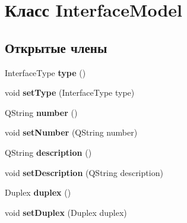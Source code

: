 \hypertarget{class_interface_model}{}\section{Класс Interface\+Model}
\label{class_interface_model}
\subsection*{Открытые члены}
\begin{DoxyCompactItemize}
\item 
Interface\+Type {\bfseries type} ()\hypertarget{class_interface_model_ab9a3cf858cda42f7f21d86c701ed9baa}{}\label{class_interface_model_ab9a3cf858cda42f7f21d86c701ed9baa}

\item 
void {\bfseries set\+Type} (Interface\+Type type)\hypertarget{class_interface_model_a6d1e3a33e22e61dfbc860a23016b936e}{}\label{class_interface_model_a6d1e3a33e22e61dfbc860a23016b936e}

\item 
Q\+String {\bfseries number} ()\hypertarget{class_interface_model_ab7d36b21ece7aaeff0ad1399eaee6877}{}\label{class_interface_model_ab7d36b21ece7aaeff0ad1399eaee6877}

\item 
void {\bfseries set\+Number} (Q\+String number)\hypertarget{class_interface_model_a7bf6cec7997845df02b48a09c8edbb6d}{}\label{class_interface_model_a7bf6cec7997845df02b48a09c8edbb6d}

\item 
Q\+String {\bfseries description} ()\hypertarget{class_interface_model_a3d75ae4692a1b497a5677dda6592ee32}{}\label{class_interface_model_a3d75ae4692a1b497a5677dda6592ee32}

\item 
void {\bfseries set\+Description} (Q\+String description)\hypertarget{class_interface_model_a720fa2dcb0864bc64204e248314ac5a7}{}\label{class_interface_model_a720fa2dcb0864bc64204e248314ac5a7}

\item 
Duplex {\bfseries duplex} ()\hypertarget{class_interface_model_ae3ccb29aa96cf1d859091d5ebc213fde}{}\label{class_interface_model_ae3ccb29aa96cf1d859091d5ebc213fde}

\item 
void {\bfseries set\+Duplex} (Duplex duplex)\hypertarget{class_interface_model_a9f82d7f6f71fe196a55ed6bbc32a2809}{}\label{class_interface_model_a9f82d7f6f71fe196a55ed6bbc32a2809}


\end{DoxyCompactItemize}
